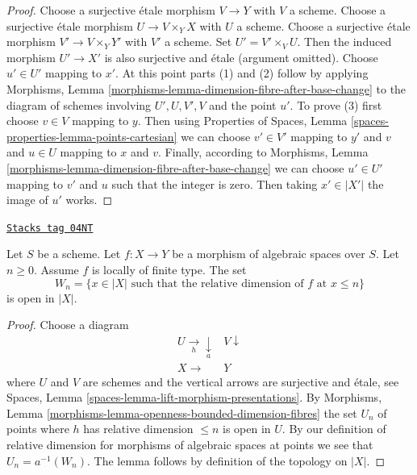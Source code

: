 \begin{proof}
Choose a surjective \'etale morphism $V \to Y$ with $V$ a scheme.
Choose a surjective \'etale morphism $U \to V \times_Y X$ with $U$ a scheme.
Choose a surjective \'etale morphism $V' \to V \times_Y Y'$ with $V'$ a scheme.
Set $U' = V' \times_V U$.
Then the induced morphism $U' \to X'$ is also surjective and
\'etale (argument omitted). Choose $u' \in U'$
mapping to $x'$. At this point parts (1) and (2) follow by applying
Morphisms, Lemma \ref{morphisms-lemma-dimension-fibre-after-base-change}
to the diagram of schemes involving $U', U, V', V$ and the point $u'$.
To prove (3) first choose $v \in V$ mapping to $y$.
Then using Properties of Spaces, Lemma
\ref{spaces-properties-lemma-points-cartesian}
we can choose $v' \in V'$ mapping to $y'$ and $v$ and
$u \in U$ mapping to $x$ and $v$. Finally, according to
Morphisms, Lemma \ref{morphisms-lemma-dimension-fibre-after-base-change}
we can choose $u' \in U'$ mapping to $v'$ and $u$ such that
the integer is zero. Then taking $x' \in |X'|$ the image of $u'$ works.
\end{proof}

\begin{lemma}
\label{spaces-morphisms-lemma-openness-bounded-dimension-fibres}
\href{https://stacks.math.columbia.edu/tag/04NT}{\texttt{Stacks tag 04NT}}

Let $S$ be a scheme.
Let $f : X \to Y$ be a morphism of algebraic spaces over $S$.
Let $n \geq 0$. Assume $f$ is locally of finite type.
The set
$$
W_n = \{x \in |X|
\text{ such that the relative dimension of }f\text{ at } x \leq n\}
$$
is open in $|X|$.
\end{lemma}

\begin{proof}
Choose a diagram
$$
\begin{array}{cc}U \underset{h}{\longrightarrow}\underset{a}{\downarrow} & V \downarrow \\ X \longrightarrow & Y\end{array}
$$
where $U$ and $V$ are schemes and the vertical arrows are surjective and
\'etale, see
Spaces, Lemma \ref{spaces-lemma-lift-morphism-presentations}.
By
Morphisms, Lemma \ref{morphisms-lemma-openness-bounded-dimension-fibres}
the set $U_n$ of points where $h$ has relative dimension
$\leq n$ is open in $U$. By our definition of relative dimension
for morphisms of algebraic spaces at points we see that
$U_n = a^{-1}(W_n)$.
The lemma follows by definition of the topology on $|X|$.
\end{proof}

